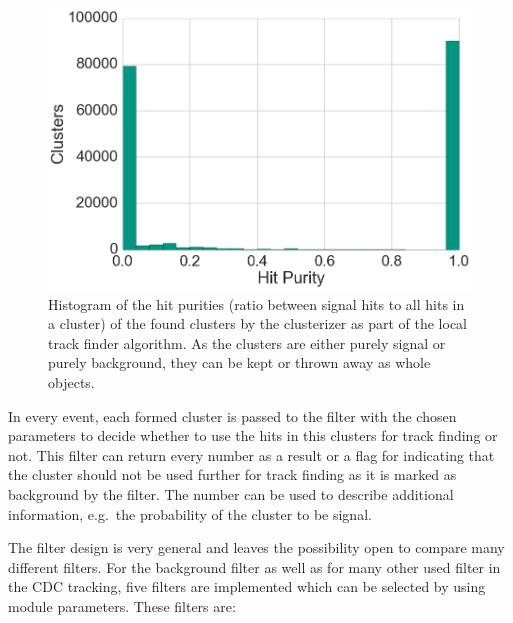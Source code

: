 \begin{figure}
  \centering
  \includegraphics[width=0.7\linewidth]{figures/workflow/cluster_purity.png}
  \caption{Histogram of the hit purities (ratio between signal hits to all hits in a cluster) of the found clusters by the clusterizer as part of the local track finder algorithm. As the clusters are either purely signal or purely background, they can be kept or thrown away as whole objects.}
  \label{fig-cluster-hit-purity}
\end{figure}

In every event, each formed cluster is passed to the filter with the chosen parameters to decide whether to use the hits in this clusters for track finding or not. This filter can return every number as a result or a flag for indicating that the cluster should not be used further for track finding as it is marked as background by the filter. The number can be used to describe additional information, e.g.\ the probability of the cluster to be signal.

The filter design is very general and leaves the possibility open to compare many different filters. For the background filter as well as for many other used filter in the CDC tracking, five filters are implemented which can be selected by using module parameters. These filters are:

